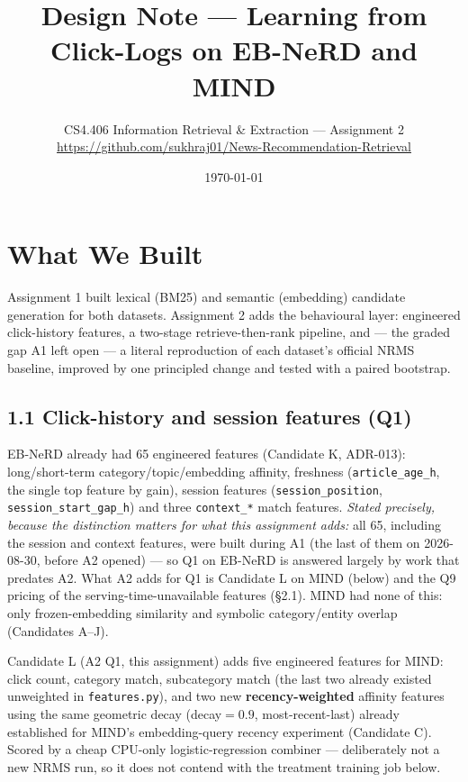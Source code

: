 \documentclass[11pt]{article}
\title{\vspace{-1em}Design Note --- Learning from Click-Logs on EB-NeRD and MIND\vspace{-0.5em}}
\author{\small CS4.406 Information Retrieval \& Extraction --- Assignment 2 \\
\small \url{https://github.com/sukhraj01/News-Recommendation-Retrieval}}
\date{\small \today}
\begin{document}
\maketitle
\vspace{-1.5em}

\section{What We Built}

Assignment 1 built lexical (BM25) and semantic (embedding) candidate
generation for both datasets. Assignment 2 adds the behavioural layer: engineered
click-history features, a two-stage retrieve-then-rank pipeline, and --- the
graded gap A1 left open --- a literal reproduction of each dataset's official
NRMS baseline, improved by one principled change and tested with a paired
bootstrap.

\subsection*{1.1 Click-history and session features (Q1)}

EB-NeRD already had 65 engineered features (Candidate K, ADR-013): long/short-term
category/topic/embedding affinity, freshness (\texttt{article\_age\_h}, the single
top feature by gain), session features (\texttt{session\_position},
\texttt{session\_start\_gap\_h}) and three \texttt{context\_*} match features.
\emph{Stated precisely, because the distinction matters for what this assignment
adds:} all 65, including the session and context features, were built during A1
(the last of them on 2026-08-30, before A2 opened) --- so Q1 on EB-NeRD is
answered largely by work that predates A2. What A2 adds for Q1 is Candidate L on
MIND (below) and the Q9 pricing of the serving-time-unavailable features
(\S2.1). MIND had none of this: only frozen-embedding similarity and symbolic
category/entity overlap (Candidates A--J).

Candidate L (A2 Q1, this assignment) adds five engineered features for MIND: click
count, category match, subcategory match (the last two already existed unweighted
in \texttt{features.py}), and two new \textbf{recency-weighted} affinity features
using the same geometric decay (decay$=0.9$, most-recent-last) already established
for MIND's embedding-query recency experiment (Candidate C). Scored by a cheap
CPU-only logistic-regression combiner --- deliberately not a new NRMS run, so it
does not contend with the treatment training job below.
\end{document}
